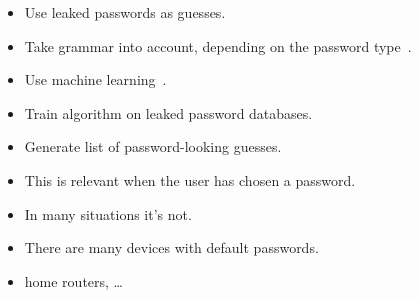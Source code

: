 \begin{frame}
  \begin{example}
    \begin{itemize}
      \item Use leaked passwords as guesses.
      \item Take grammar into account, depending on the password 
        type~\cite{Bonneau2012ghs,Bonneau2012lpo}.
    \end{itemize}
  \end{example}

  \pause

  \begin{example}
    \begin{itemize}
      \item Use machine learning~\cite{JohnTheRipper,OMEN,WeirPCFG}.
      \item Train algorithm on leaked password databases.
      \item Generate list of password-looking guesses.
    \end{itemize}
  \end{example}
\end{frame}

\begin{frame}
  \begin{remark}
    \begin{itemize}
      \item This is relevant when the user has chosen a password.
      \item In many situations it's not.
    \end{itemize}
  \end{remark}

  \pause{}

  \begin{example}
    \begin{itemize}
      \item There are many devices with default passwords.
      \item \Eg home routers, \dots
    \end{itemize}
  \end{example}
\end{frame}

